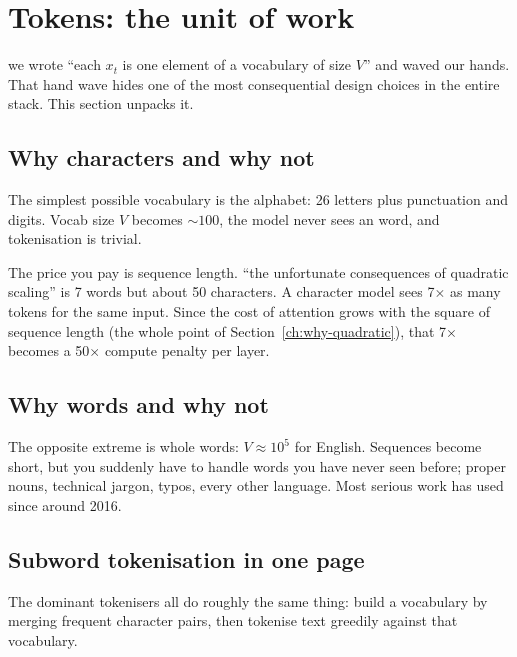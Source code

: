 \section{Tokens: the unit of work}
\label{ch:tokens}

 we wrote ``each \(x_t\) is one
element of a vocabulary of size \(V\)'' and waved our hands. That hand wave
hides one of the most consequential design choices in the entire stack. This
section unpacks it.

\subsection{Why characters and why not}

The simplest possible vocabulary is the alphabet: 26 letters plus punctuation
and digits. Vocab size \(V\) becomes ${\sim}100$, the model never sees an
 word, and tokenisation is trivial.

The price you pay is sequence length. ``the unfortunate consequences of
quadratic scaling'' is 7 words but about 50 characters. A character model
sees 7$\times$ as many tokens for the same input. Since the cost of attention
grows with the square of sequence length (the whole point of
Section~\ref{ch:why-quadratic}), that 7$\times$ becomes a 50$\times$ compute
penalty per layer.

\subsection{Why words and why not}

The opposite extreme is whole words: \(V \approx 10^5\) for English. Sequences
become short, but you suddenly have to handle words you have never seen
before; proper nouns, technical jargon, typos, every other language. Most
serious work has used  since around 2016.

\subsection{Subword tokenisation in one page}

The dominant tokenisers all do roughly the same thing: build a vocabulary by
merging frequent character pairs, then tokenise text greedily against that
vocabulary.

